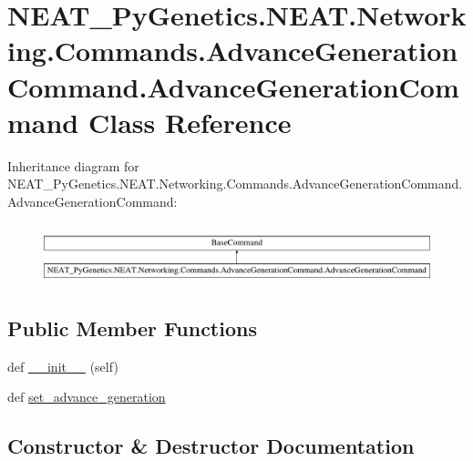 \hypertarget{classNEAT__PyGenetics_1_1NEAT_1_1Networking_1_1Commands_1_1AdvanceGenerationCommand_1_1AdvanceGenerationCommand}{}\section{N\+E\+A\+T\+\_\+\+Py\+Genetics.\+N\+E\+A\+T.\+Networking.\+Commands.\+Advance\+Generation\+Command.\+Advance\+Generation\+Command Class Reference}
\label{classNEAT__PyGenetics_1_1NEAT_1_1Networking_1_1Commands_1_1AdvanceGenerationCommand_1_1AdvanceGenerationCommand}
Inheritance diagram for N\+E\+A\+T\+\_\+\+Py\+Genetics.\+N\+E\+A\+T.\+Networking.\+Commands.\+Advance\+Generation\+Command.\+Advance\+Generation\+Command\+:\begin{figure}[H]
\begin{center}
\leavevmode
\includegraphics[height=1.758242cm]{classNEAT__PyGenetics_1_1NEAT_1_1Networking_1_1Commands_1_1AdvanceGenerationCommand_1_1AdvanceGenerationCommand}
\end{center}
\end{figure}
\subsection*{Public Member Functions}
\begin{DoxyCompactItemize}
\item 
def \hyperlink{classNEAT__PyGenetics_1_1NEAT_1_1Networking_1_1Commands_1_1AdvanceGenerationCommand_1_1AdvanceGenerationCommand_aa5c2d4cae5b431359a0563a53f2e8020}{\+\_\+\+\_\+init\+\_\+\+\_\+} (self)
\item 
def \hyperlink{classNEAT__PyGenetics_1_1NEAT_1_1Networking_1_1Commands_1_1AdvanceGenerationCommand_1_1AdvanceGenerationCommand_a2d1945cf45fc83a8fc73aa690829969d}{set\+\_\+advance\+\_\+generation}
\end{DoxyCompactItemize}


\subsection{Constructor \& Destructor Documentation}
